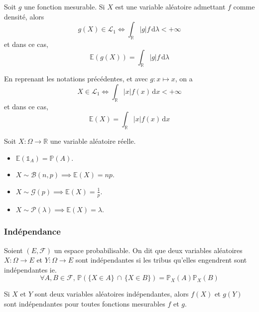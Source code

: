   \begin{corollary}
    Soit $g$ une fonction mesurable. Si $X$ est une variable aléatoire admettant $f$ comme densité, alors
    \[ g(X) \in \mathcal{L}_1 \iff \int_{\mathbb{R}} \vert g \vert f \, \mathrm{d}\lambda < +\infty \]
    et dans ce cas,
    \[ \mathbb{E}(g(X)) = \int_{\mathbb{R}} \vert g \vert f \, \mathrm{d}\lambda \]
  \end{corollary}

  \begin{remark}
    En reprenant les notations précédentes, et avec $g : x \mapsto x$, on a
    \[ X \in \mathcal{L}_1 \iff \int_{\mathbb{R}} \vert x \vert f(x) \, \mathrm{d}x < +\infty \]
    et dans ce cas,
    \[ \mathbb{E}(X) = \int_{\mathbb{R}} \vert x \vert f(x) \, \mathrm{d}x \]
  \end{remark}


  \begin{example}
    Soit $X : \Omega \rightarrow \mathbb{R}$ une variable aléatoire réelle.
    \begin{itemize}
      \item $\mathbb{E}(\mathbb{1}_A) = \mathbb{P}(A)$.
      \item $X \sim \mathcal{B}(n, p) \implies \mathbb{E}(X) = np$.
      \item $X \sim \mathcal{G}(p) \implies \mathbb{E}(X) = \frac{1}{p}$.
      \item $X \sim \mathcal{P}(\lambda) \implies \mathbb{E}(X) = \lambda$.
    \end{itemize}
  \end{example}

  \subsubsection{Indépendance}


  \begin{definition}
    Soient $(E, \mathcal{F})$ un espace probabilisable. On dit que deux variables aléatoires $X : \Omega \rightarrow E$ et $Y : \Omega \rightarrow E$ sont indépendantes si les tribus qu'elles engendrent sont indépendantes ie.
    \[ \forall A, B \in \mathcal{F}, \, \mathbb{P}(\{ X \in A \} \, \cap \, \{ X \in B \}) = \mathbb{P}_X(A) \mathbb{P}_X(B) \]
  \end{definition}

  \begin{proposition}
    Si $X$ et $Y$ sont deux variables aléatoires indépendantes, alors $f(X)$ et $g(Y)$ sont indépendantes pour toutes fonctions mesurables $f$ et $g$.
  \end{proposition}

